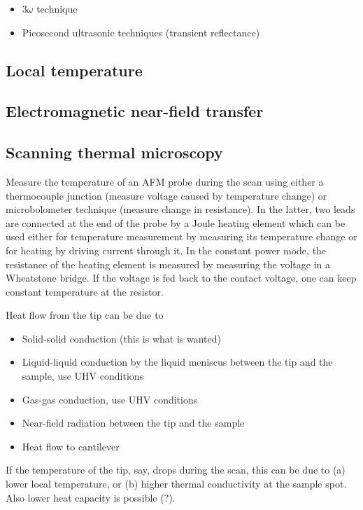 \begin{itemize}
 \item $3\omega$ technique
 \item Picosecond ultrasonic techniques (transient reflectance)
\end{itemize}

\subsection{Local temperature}

\subsection{Electromagnetic near-field transfer}

\subsection{Scanning thermal microscopy}

Measure the temperature of an AFM probe during the scan using either a thermocouple junction (measure voltage caused by temperature change) or microbolometer technique (measure change in resistance). In the latter, two leads are connected at the end of the probe by a Joule heating element which can be used either for temperature measurement by measuring its temperature change or for heating by driving current through it. In the constant power mode, the resistance of the heating element is measured by measuring the voltage in a Wheatstone bridge. If the voltage is fed back to the contact voltage, one can keep constant temperature at the resistor. 

Heat flow from the tip can be due to
\begin{itemize}
 \item Solid-solid conduction (this is what is wanted)
 \item Liquid-liquid conduction by the liquid meniscus between the tip and the sample, use UHV conditions
 \item Gas-gas conduction, use UHV conditions
 \item Near-field radiation between the tip and the sample
 \item Heat flow to cantilever
\end{itemize}

If the temperature of the tip, say, drops during the scan, this can be due to (a) lower local temperature, or (b) higher thermal conductivity at the sample spot. Also lower heat capacity is possible (?). 

